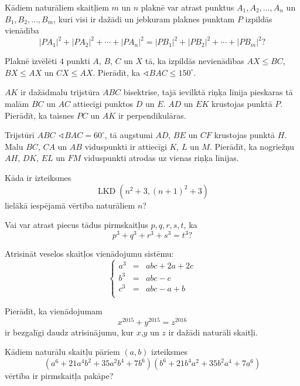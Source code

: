 \documentclass[11pt]{article}
\begin{document}
\begin{problem}[BW.TST.2016.12]
Kādiem naturāliem skaitļiem $m$ un $n$ plaknē var atrast punktus $A_1, A_2,\ldots,A_n$ un 
$B_1,B_2,\ldots,B_m$, kuri visi ir dažādi un jebkuram plaknes punktam $P$ izpildās vienādība
\[ |PA_1|^2 + |PA_2|^2 + \cdots + |PA_n|^2 = 
|PB_1|^2 + |PB_2|^2 + \cdots + |PB_m|^2 ? \]
\end{problem}

\begin{problem}[BW.TST.2016.13]
Plaknē izvēlēti $4$ punkti $A$, $B$, $C$ un $X$ tā, ka izpildās nevienādības 
$AX \leq BC$, $BX \leq AX$ un $CX \leq AX$. Pierādīt, ka 
$\sphericalangle BAC \leq 150^{\circ}$. 
\end{problem}

\begin{problem}[BW.TST.2016.14]
$AK$ ir dažādmalu trijstūra $ABC$ bisektrise, tajā ievilktā riņķa līnija pieskaras 
tā malām $BC$ un $AC$ attiecīgi punktos $D$ un $E$. $AD$ un $EK$ krustojas punktā $P$. 
Pierādīt, ka taisnes $PC$ un $AK$ ir perpendikulāras. 
\end{problem}

\begin{problem}[BW.TST.2016.15]
Trijstūrī $ABC$ $\sphericalangle BAC = 60^{\circ}$, tā augstumi $AD$, $BE$ un $CF$ 
krustojas punktā $H$. Malu $BC$, $CA$ un $AB$ viduspunkti ir attiecīgi $K$, $L$ un $M$. 
Pierādīt, ka nogriežņu $AH$, $DK$, $EL$ un $FM$ viduspunkti atrodas uz vienas riņķa līnijas. 
\end{problem}

\begin{problem}[BW.TST.2016.16]
Kāda ir izteiksmes
\[ \operatorname{LKD}\left( n^2 + 3, (n+1)^2 + 3 \right) \]
lielākā iespējamā vērtība naturāliem $n$?  
\end{problem}

\begin{problem}[BW.TST.2016.17]
Vai var atrast piecus tādus pirmskaitļus $p, q, r, s, t$, ka 
\[ p^3 + q^3 + r^3 + s^3 = t^3 ? \] 
\end{problem}

\begin{problem}[BW.TST.2016.18]
Atrisināt veselos skaitļos vienādojumu sistēmu:
\[ 
\left\{ \begin{array}{ccl}
a^3 & = & abc + 2a + 2c \\
b^3 & = & abc - c\\
c^3 & = & abc - a + b\\
\end{array} \right. 
\]
\end{problem}

\begin{problem}[BW.TST.2016.19]
Pierādīt, ka vienādojumam 
\[ x^{2015} + y^{2015} = z^{2016} \]
ir bezgalīgi daudz atrisinājumu, kur $x$,$y$ un $z$ ir dažādi naturāli skaitļi. 
\end{problem}

\begin{problem}[BW.TST.2016.20]
Kādiem naturālu skaitļu pāriem $(a,b)$ izteiksmes 
\[ \left(a^6 + 21a^4b^2 + 35a^2 b^4 + 7b^6 \right) \left( b^6 + 21 b^4 a^2 + 35 b^2 a^4 + 7a^6 \right) \]
vērtība ir pirmskaitļa pakāpe?
\end{problem}
\end{document}
